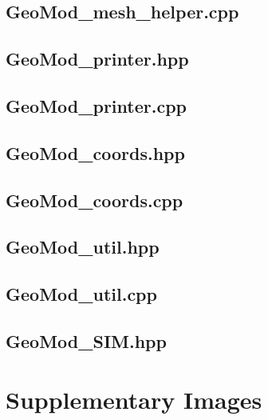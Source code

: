 \documentclass[a4paper, 12pt]{article}
\begin{document}
\subsection{GeoMod\_mesh\_helper.cpp} \label{subsec:mesh_cpp}


\subsection{GeoMod\_printer.hpp} \label{subsec:printer_hpp}

\subsection{GeoMod\_printer.cpp} \label{subsec:printer_cpp}


\subsection{GeoMod\_coords.hpp} \label{subsec:coords_hpp}

\subsection{GeoMod\_coords.cpp} \label{subsec:coords_cpp}


\subsection{GeoMod\_util.hpp} \label{subsec:util_hpp}

\subsection{GeoMod\_util.cpp} \label{subsec:util_cpp}


\subsection{GeoMod\_SIM.hpp} \label{subsec:SIM_hpp}


\newpage
\section{Supplementary Images} \label{sec:img}
\end{document}
